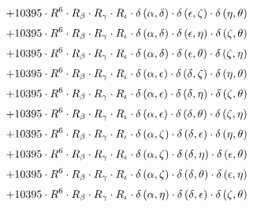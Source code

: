 \begin{subequations}
\begin{gather}
 \\[0.2em] \notag 		 + 10395 \cdot R^{6} \cdot R_{\beta{}} \cdot R_{\gamma{}} \cdot R_{\iota{}} \cdot \delta{}\left(\alpha{}, \delta{}\right) \cdot \delta{}\left(\epsilon{}, \zeta{}\right) \cdot \delta{}\left(\eta{}, \theta{}\right) 
 \\[0.2em] \notag 		 + 10395 \cdot R^{6} \cdot R_{\beta{}} \cdot R_{\gamma{}} \cdot R_{\iota{}} \cdot \delta{}\left(\alpha{}, \delta{}\right) \cdot \delta{}\left(\epsilon{}, \eta{}\right) \cdot \delta{}\left(\zeta{}, \theta{}\right) 
 \\[0.2em] \notag 		 + 10395 \cdot R^{6} \cdot R_{\beta{}} \cdot R_{\gamma{}} \cdot R_{\iota{}} \cdot \delta{}\left(\alpha{}, \delta{}\right) \cdot \delta{}\left(\epsilon{}, \theta{}\right) \cdot \delta{}\left(\zeta{}, \eta{}\right) 
 \\[0.2em] \notag 		 + 10395 \cdot R^{6} \cdot R_{\beta{}} \cdot R_{\gamma{}} \cdot R_{\iota{}} \cdot \delta{}\left(\alpha{}, \epsilon{}\right) \cdot \delta{}\left(\delta{}, \zeta{}\right) \cdot \delta{}\left(\eta{}, \theta{}\right) 
 \\[0.2em] \notag 		 + 10395 \cdot R^{6} \cdot R_{\beta{}} \cdot R_{\gamma{}} \cdot R_{\iota{}} \cdot \delta{}\left(\alpha{}, \epsilon{}\right) \cdot \delta{}\left(\delta{}, \eta{}\right) \cdot \delta{}\left(\zeta{}, \theta{}\right) 
 \\[0.2em] \notag 		 + 10395 \cdot R^{6} \cdot R_{\beta{}} \cdot R_{\gamma{}} \cdot R_{\iota{}} \cdot \delta{}\left(\alpha{}, \epsilon{}\right) \cdot \delta{}\left(\delta{}, \theta{}\right) \cdot \delta{}\left(\zeta{}, \eta{}\right) 
 \\[0.2em] \notag 		 + 10395 \cdot R^{6} \cdot R_{\beta{}} \cdot R_{\gamma{}} \cdot R_{\iota{}} \cdot \delta{}\left(\alpha{}, \zeta{}\right) \cdot \delta{}\left(\delta{}, \epsilon{}\right) \cdot \delta{}\left(\eta{}, \theta{}\right) 
 \\[0.2em] \notag 		 + 10395 \cdot R^{6} \cdot R_{\beta{}} \cdot R_{\gamma{}} \cdot R_{\iota{}} \cdot \delta{}\left(\alpha{}, \zeta{}\right) \cdot \delta{}\left(\delta{}, \eta{}\right) \cdot \delta{}\left(\epsilon{}, \theta{}\right) 
 \\[0.2em] \notag 		 + 10395 \cdot R^{6} \cdot R_{\beta{}} \cdot R_{\gamma{}} \cdot R_{\iota{}} \cdot \delta{}\left(\alpha{}, \zeta{}\right) \cdot \delta{}\left(\delta{}, \theta{}\right) \cdot \delta{}\left(\epsilon{}, \eta{}\right) 
 \\[0.2em] \notag 		 + 10395 \cdot R^{6} \cdot R_{\beta{}} \cdot R_{\gamma{}} \cdot R_{\iota{}} \cdot \delta{}\left(\alpha{}, \eta{}\right) \cdot \delta{}\left(\delta{}, \epsilon{}\right) \cdot \delta{}\left(\zeta{}, \theta{}\right) 

\end{gather}
\end{subequations}
